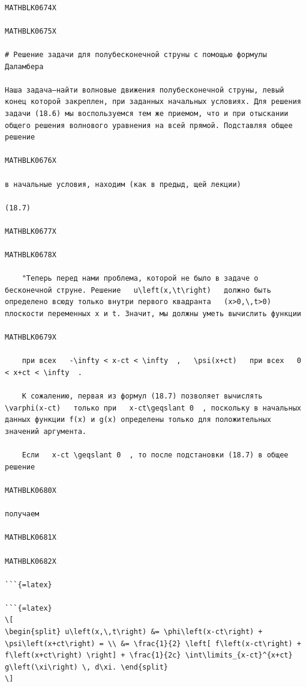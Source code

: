 \documentclass[
]{article}
\begin{document}
\begin{verbatim}

MATHBLK0674X

MATHBLK0675X

# Решение задачи для полубесконечной струны с помощью формулы Даламбера

Наша задача—найти волновые движения полубесконечной струны, левый конец которой закреплен, при заданных начальных условиях. Для решения задачи (18.6) мы воспользуемся тем же приемом, что и при отыскании общего решения волнового уравнения на всей прямой. Подставляя общее решение

MATHBLK0676X

в начальные условия, находим (как в предыд, щей лекции)

(18.7)

MATHBLK0677X

MATHBLK0678X

    "Теперь перед нами проблема, которой не было в задаче о бесконечной струне. Решение   u\left(x,\t\right)   должно быть определено всюду только внутри первого квадранта   (x>0,\,t>0)   плоскости переменных x и t. Значит, мы должны уметь вычислить функции

MATHBLK0679X

    при всех   -\infty < x-ct < \infty  ,   \psi(x+ct)   при всех   0 < x+ct < \infty  .

    К сожалению, первая из формул (18.7) позволяет вычислять   \varphi(x-ct)   только при   x-ct\geqslant 0  , поскольку в начальных данных функции f(x) и g(x) определены только для положительных значений аргумента.

    Если   x-ct \geqslant 0  , то после подстановки (18.7) в общее решение

MATHBLK0680X

получаем

MATHBLK0681X

MATHBLK0682X

```{=latex}

```{=latex}
\[
\begin{split} u\left(x,\,t\right) &= \phi\left(x-ct\right) + \psi\left(x+ct\right) = \\ &= \frac{1}{2} \left[ f\left(x-ct\right) + f\left(x+ct\right) \right] + \frac{1}{2c} \int\limits_{x-ct}^{x+ct} g\left(\xi\right) \, d\xi. \end{split}
\]
\end{verbatim}
\end{document}

